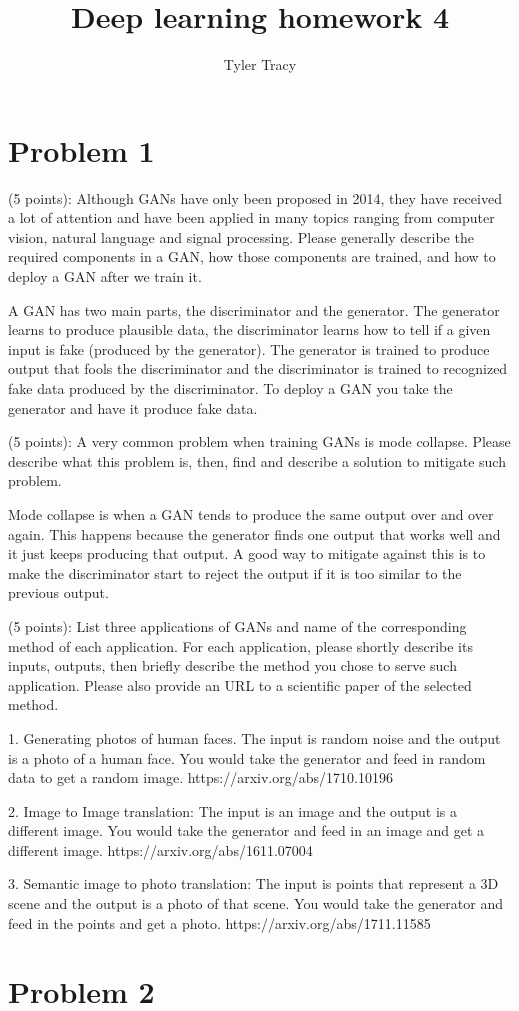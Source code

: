 \documentclass[12pt]{article}
\title{Deep learning homework 4}
\author{Tyler Tracy}
\begin{document}
\maketitle


\section*{Problem 1}

(5 points): Although GANs have only been proposed in 2014, they have received a lot of attention and have been applied in many topics ranging from computer vision, natural language and signal processing. Please generally describe the required components in a GAN, how those components are trained, and how to deploy a GAN after we train it.

A GAN has two main parts, the discriminator and the generator. The generator learns to produce plausible data, the discriminator learns how to tell if a given input is fake (produced by the generator). The generator is trained to produce output that fools the discriminator and the discriminator is trained to recognized fake data produced by the discriminator. To deploy a GAN you take the generator and have it produce fake data.


(5 points): A very common problem when training GANs is mode collapse. Please describe what this problem is, then, find and describe a solution to mitigate such problem.

Mode collapse is when a GAN tends to produce the same output over and over again. This happens because the generator finds one output that works well and it just keeps producing that output. A good way to mitigate against this is to make the discriminator start to reject the output if it is too similar to the previous output.

(5 points): List three applications of GANs and name of the corresponding method of each application.  For each application, please shortly describe its inputs, outputs, then briefly describe the method you chose to serve such application. Please also provide an URL to a scientific paper of the selected method.

1. Generating photos of human faces. The input is random noise and the output is a photo of a human face. You would take the generator and feed in random data to get a random image. https://arxiv.org/abs/1710.10196

2. Image to Image translation: The input is an image and the output is a different image. You would take the generator and feed in an image and get a different image. https://arxiv.org/abs/1611.07004

3. Semantic image to photo translation: The input is points that represent a 3D scene and the output is a photo of that scene. You would take the generator and feed in the points and get a photo. https://arxiv.org/abs/1711.11585

\section*{Problem 2}
\end{document}
